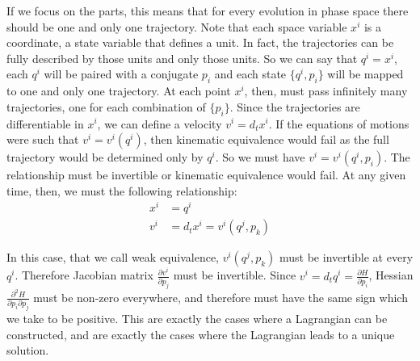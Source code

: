 \documentclass[letterpaper]{article}
\begin{document}
If we focus on the parts, this means that for every evolution in phase space there should be one and only one trajectory. Note that each space variable $x^i$ is a coordinate, a state variable that defines a unit. In fact, the trajectories can be fully described by those units and only those units. So we can say that $q^i=x^i$, each $q^i$ will be paired with a conjugate $p_i$ and each state $\{q^i, p_i\}$ will be mapped to one and only one trajectory. At each point $x^i$, then, must pass infinitely many trajectories, one for each combination of $\{p_i\}$. Since the trajectories are differentiable in $x^i$, we can define a velocity $v^i = d_t x^i$. If the equations of motions were such that $v^i=v^i(q^i)$, then kinematic equivalence would fail as the full trajectory would be determined only by $q^i$. So we must have $v^i=v^i(q^i, p_i)$. The relationship must be invertible or kinematic equivalence would fail. At any given time, then, we must the following relationship:
\begin{equation}
\begin{aligned}
x^i &= q^i \\
v^i &= d_t x^i = v^i(q^j, p_k)
\end{aligned}
\end{equation}

In this case, that we call weak equivalence, $v^i(q^j, p_k)$ must be invertible at every $q^i$. Therefore Jacobian matrix  $\frac{\partial v^i}{\partial p_j}$ must be invertible. Since $v^i = d_t q^i = \frac{\partial H}{\partial p_i}$, Hessian $\frac{\partial^2 H}{\partial p_i \partial p_j}$ must be non-zero everywhere, and therefore must have the same sign which we take to be positive. This are exactly the cases where a Lagrangian can be constructed, and are exactly the cases where the Lagrangian leads to a unique solution.
\end{document}
